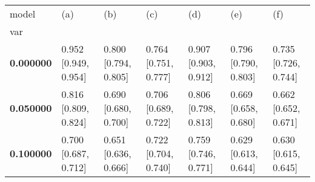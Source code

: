 \begin{tabular}{lllllll}
\toprule
model & (a) & (b) & (c) & (d) & (e) & (f) \\
var &  &  &  &  &  &  \\
\midrule
\textbf{0.000000} & 0.952
[0.949, 0.954] & 0.800
[0.794, 0.805] & 0.764
[0.751, 0.777] & 0.907
[0.903, 0.912] & 0.796
[0.790, 0.803] & 0.735
[0.726, 0.744] \\
\textbf{0.050000} & 0.816
[0.809, 0.824] & 0.690
[0.680, 0.700] & 0.706
[0.689, 0.722] & 0.806
[0.798, 0.813] & 0.669
[0.658, 0.680] & 0.662
[0.652, 0.671] \\
\textbf{0.100000} & 0.700
[0.687, 0.712] & 0.651
[0.636, 0.666] & 0.722
[0.704, 0.740] & 0.759
[0.746, 0.771] & 0.629
[0.613, 0.644] & 0.630
[0.615, 0.645] \\
\bottomrule
\end{tabular}
